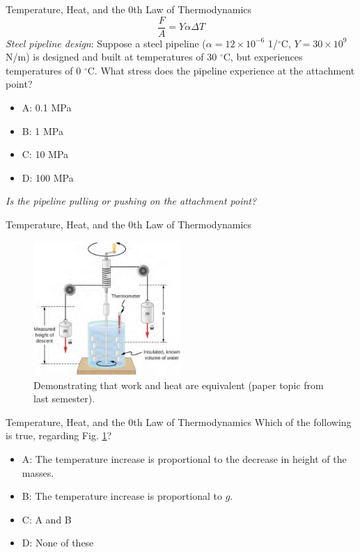 \documentclass{beamer}
\begin{document}
\begin{frame}{Temperature, Heat, and the 0th Law of Thermodynamics}
\begin{equation}
\frac{F}{A} = Y \alpha \Delta T
\end{equation}
\textit{Steel pipeline design}: Suppose a steel pipeline ($\alpha = 12 \times 10^{-6}$ 1/$^{\circ}$C, $Y = 30\times 10^{9}$ N/m) is designed and built at temperatures of 30 $^{\circ}$C, but experiences temperatures of 0 $^{\circ}$C.  What stress does the pipeline experience at the attachment point?
\begin{itemize}
\item A: 0.1 MPa
\item B: 1 MPa
\item C: 10 MPa
\item D: 100 MPa
\end{itemize}
\textit{Is the pipeline pulling or pushing on the attachment point?}
\end{frame}

\begin{frame}{Temperature, Heat, and the 0th Law of Thermodynamics}
\begin{figure}
\centering
\includegraphics[width=0.5\textwidth]{figures/Joule.png}
\caption{\label{fig:Joule} Demonstrating that work and heat are equivalent (paper topic from last semester).}
\end{figure}
\end{frame}

\begin{frame}{Temperature, Heat, and the 0th Law of Thermodynamics}
Which of the following is true, regarding Fig. \ref{fig:Joule}?
\begin{itemize}
\item A: The temperature increase is proportional to the decrease in height of the masses.
\item B: The temperature increase is proportional to $g$.
\item C: A and B
\item D: None of these
\end{itemize}
\end{frame}
\end{document}
